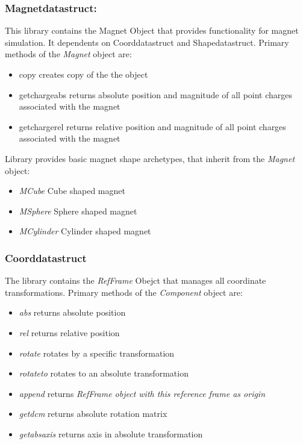\subsubsection{Magnet\textunderscore data\textunderscore struct:} This library contains the Magnet Object that provides functionality for magnet simulation. It dependents on Coord\textunderscore data\textunderscore struct and Shape\textunderscore data\textunderscore struct. Primary methods of the \textit{Magnet} object are:
\begin{itemize}
    \item {copy} creates copy of the the object
    \item {get\textunderscore charge\textunderscore abs} returns absolute position and magnitude of all point charges associated with the magnet
    \item {get\textunderscore charge\textunderscore rel} returns relative position and magnitude of all point charges associated with the magnet
\end{itemize}
Library provides basic magnet shape archetypes, that inherit from the \textit{Magnet} object:
\begin{itemize}
    \item \textit{MCube} Cube shaped magnet
    \item \textit{MSphere} Sphere shaped magnet
    \item \textit{MCylinder} Cylinder shaped magnet
\end{itemize}
\subsubsection{Coord\textunderscore data\textunderscore struct} 
The library contains the \textit{RefFrame} Obejct that manages all coordinate transformations. Primary methods of the \textit{Component} object are:
\begin{itemize}
    \item \textit{abs} returns absolute position
    \item \textit{rel} returns relative position
    \item \textit{rotate} rotates by a specific transformation
    \item \textit{rotate\textunderscore to} rotates to an absolute transformation
    \item \textit{append} returns \textit{RefFrame object with this reference frame as origin}
    \item \textit{get\textunderscore dcm} returns absolute rotation matrix
    \item \textit{get\textunderscore abs\textunderscore axis} returns axis in absolute transformation
\end{itemize}


